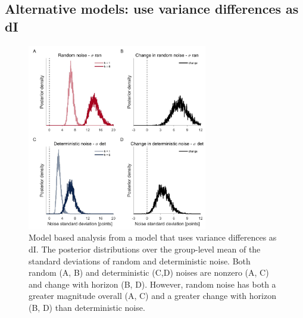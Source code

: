 \documentclass[12pt]{article}
\begin{document}
	\subsection{Alternative models: use variance differences as dI}
	\begin{figure}[H]
		\begin{center}
			\includegraphics[width=0.7\textwidth]{figures/R1_hyperprior_dIvar.jpg}
			\caption{Model based analysis from a model that uses variance differences as dI. The posterior distributions over the group-level mean of the standard deviations of  random and deterministic noise. Both random (A, B) and deterministic (C,D) noises are nonzero (A, C) and change with horizon (B, D).  However, random noise has both a greater magnitude overall (A, C) and a greater change with horizon (B, D) than deterministic noise.}
			\label{fig:s8}
		\end{center}
	\end{figure}
\end{document}
